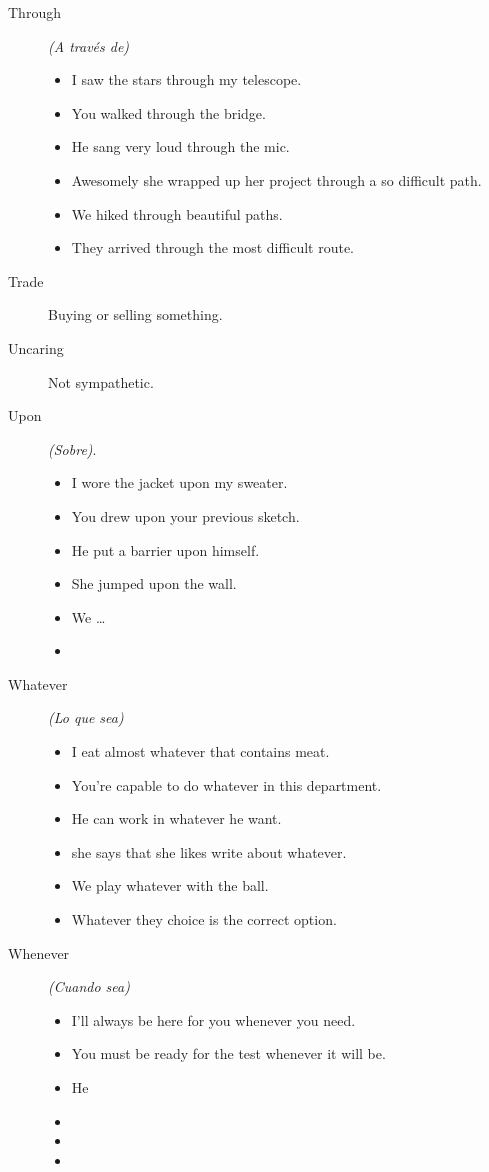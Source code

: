 \begin{multicols}{2}
\begin{description}
\item[Through] \emph{(A través de)}
\begin{itemize}
\item I saw the stars through my telescope.
\item You walked through the bridge.
\item He sang very loud through the mic.
\item Awesomely she wrapped up her project through a so difficult path.
\item We hiked through beautiful paths.
\item They arrived through the most difficult route.
\end{itemize}

\item[Trade] Buying or selling something.

\item[Uncaring] Not sympathetic.

\item[Upon] \emph{(Sobre)}.
\begin{itemize}
\item I wore the jacket upon my sweater.
\item You drew upon your previous sketch.
\item He put a barrier upon himself.
\item She jumped upon the wall.
\item We \dots
\item 
\end{itemize}

\item[Whatever] \emph{(Lo que sea)}
\begin{itemize}
\item I eat almost whatever that contains meat.
\item You're capable to do whatever in this department.
\item He can work in whatever he want.
\item she says that she likes write about whatever.
\item We play whatever with the ball.
\item Whatever they choice is the correct option.
\end{itemize}

\item[Whenever] \emph{(Cuando sea)}
\begin{itemize}
\item I'll always be here for you whenever you need.
\item You must be ready for the test whenever it will be.
\item He 
\item 
\item 
\item 
\end{itemize}


\end{description}
\end{multicols}

